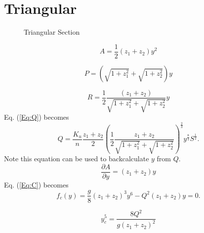 \section{Triangular}

\begin{figure}[h]
\centering
{}
\caption{Triangular Section}
\end{figure}

\begin{equation}
A = \frac{1}{2} (z_1 + z_2) y^2
\end{equation}

\begin{equation}
P = \left(\sqrt{1+z_1^2} + \sqrt{1+z_2^2}\right)y
\end{equation}

\begin{equation}
R = \frac{1}{2}\frac{(z_1 + z_2) }{\sqrt{1+z_1^2} + \sqrt{1+z_2^2}}y
\end{equation}
Eq. (\ref{Eq:Q}) becomes
\begin{equation}
Q = \frac{K_u}{n} \frac{z_1 + z_2}{2}  \left(\frac{1}{2}\frac{z_1 + z_2}{\sqrt{1+z_1^2} + \sqrt{1+z_2^2}}\right)^{\frac{2}{3}} y^{\frac{8}{3}}S^{\frac{1}{2}}.
\end{equation}
Note this equation can be used to backcalculate $y$ from $Q$.
\begin{equation}
\frac{\partial A}{\partial y} = (z_1 + z_2)y
\end{equation}
Eq. (\ref{Eq:C}) becomes
\begin{equation}  
f_c(y)= \frac{g}{8}(z_1 + z_2)^3y^6 - Q^2(z_1 + z_2)y = 0.
\end{equation}

\begin{equation}  
y_c^5 = \frac{8Q^2}{g(z_1 + z_2)^2}
\end{equation}

